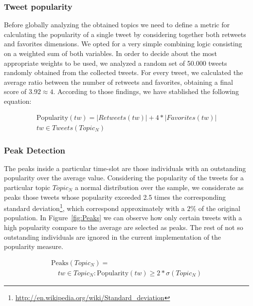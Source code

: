 \documentclass{sig-alternate}
\begin{document}
\subsubsection{Tweet popularity}

Before globally analyzing the obtained topics we need to define a metric for calculating the popularity of a single tweet by considering together both retweets and favorites dimensions. We opted for a very simple combining logic consisting on a weighted sum of both variables. In order to decide about the most appropriate weights to be used, we analyzed a random set of 50.000 tweets randomly obtained from the collected tweets. For every tweet, we calculated the average ratio between the number of retweets and favorites, obtaining a final score of $3.92 \approx 4$. According to those findings, we have stablished the following equation:

\begin{equation}
\begin{split}
\text{Popularity}(tw) = \left |Retweets(tw)  \right | + 4*\left |Favorites(tw)  \right | \\
tw \in Tweets(Topic_N)
\end{split}
\end{equation}

\subsubsection{Peak Detection}

The peaks inside a particular time-slot are those individuals with an outstanding popularity over the average value. Considering the popularity of the tweets for a particular topic $Topic_N$ a normal distribution over the sample, we considerate as peaks those tweets whose popularity exceeded 2.5 times the corresponding standard deviation\footnote{\fontsize{8pt}{1em}\selectfont \url{http://en.wikipedia.org/wiki/Standard_deviation}}, which correspond approximately with a $2\%$ of the original population. In Figure~\ref{fig:Peaks} we can observe how only certain tweets with a high popularity compare to the average are selected as peaks. The rest of not so outstanding individuals are ignored in the current implementation of the popularity measure.

\begin{equation}
\begin{split}
\text{Peaks}(Topic_N) = \\
 \quad tw \in Topic_N : \text{Popularity}(tw) \geq 2*\sigma (Topic_N)
\end{split}
\end{equation}
\end{document}
